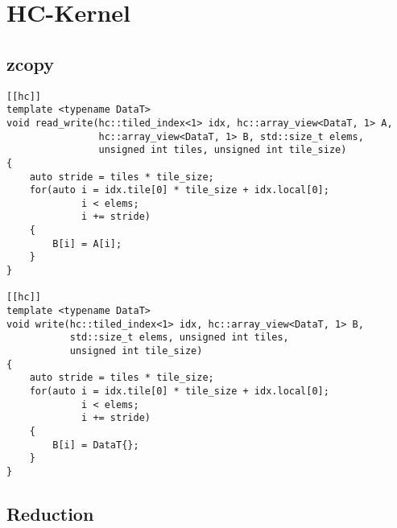 \section{HC-Kernel}

\subsection{zcopy}

\begin{code}
    \begin{verbatim}
[[hc]]
template <typename DataT>
void read_write(hc::tiled_index<1> idx, hc::array_view<DataT, 1> A,
                hc::array_view<DataT, 1> B, std::size_t elems,
                unsigned int tiles, unsigned int tile_size)
{
    auto stride = tiles * tile_size;
    for(auto i = idx.tile[0] * tile_size + idx.local[0];
             i < elems;
             i += stride)
    {
        B[i] = A[i];
    }
}

[[hc]]
template <typename DataT>
void write(hc::tiled_index<1> idx, hc::array_view<DataT, 1> B,
           std::size_t elems, unsigned int tiles,
           unsigned int tile_size)
{
    auto stride = tiles * tile_size;
    for(auto i = idx.tile[0] * tile_size + idx.local[0];
             i < elems;
             i += stride)
    {
        B[i] = DataT{};
    }
}
    \end{verbatim}
    \caption{zcopy - HC-Implementierung}
    \label{anhang:hc:zcopy}
\end{code}

\subsection{Reduction}

